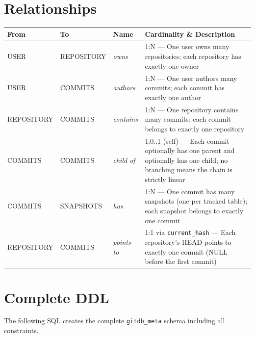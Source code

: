 \documentclass[12pt, a4paper]{article}
\begin{document}
\section{Relationships}

\begin{center}
\begin{tabular}{l l l p{6.5cm}}
\toprule
\textbf{From} & \textbf{To} & \textbf{Name} & \textbf{Cardinality \& Description} \\
\midrule
USER       & REPOSITORY & \textit{owns}      & 1:N --- One user owns many repositories; each repository has exactly one owner \\[4pt]
USER       & COMMITS    & \textit{authors}   & 1:N --- One user authors many commits; each commit has exactly one author \\[4pt]
REPOSITORY & COMMITS    & \textit{contains}  & 1:N --- One repository contains many commits; each commit belongs to exactly one repository \\[4pt]
COMMITS    & COMMITS    & \textit{child of}  & 1:0..1 (self) --- Each commit optionally has one parent and optionally has one child; no branching means the chain is strictly linear \\[4pt]
COMMITS    & SNAPSHOTS  & \textit{has}       & 1:N --- One commit has many snapshots (one per tracked table); each snapshot belongs to exactly one commit \\[4pt]
REPOSITORY & COMMITS    & \textit{points to} & 1:1 via \texttt{current\_hash} --- Each repository's HEAD points to exactly one commit (NULL before the first commit) \\
\bottomrule
\end{tabular}
\end{center}

\section{Complete DDL}

The following SQL creates the complete \texttt{gitdb\_meta} schema including
all constraints.
\end{document}
